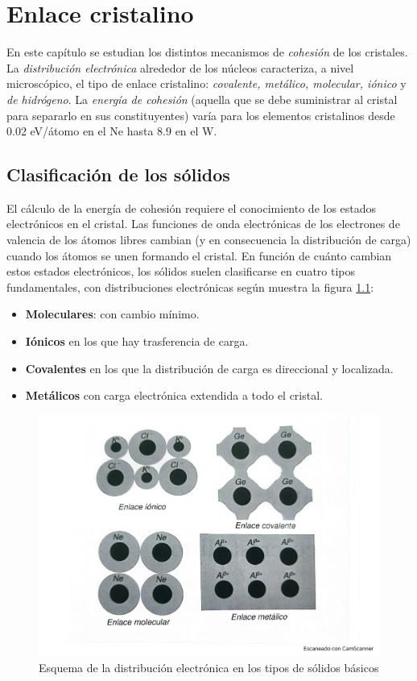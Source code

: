 \chapter{Enlace cristalino}

En este capítulo se estudian los distintos mecanismos de \textit{cohesión} de los cristales. La \textit{distribución electrónica} alrededor de los núcleos caracteriza, a nivel microscópico, el tipo de enlace cristalino: \textit{covalente, metálico, molecular, iónico} y \textit{de hidrógeno}. La \textit{energía de cohesión} (aquella que se debe suministrar al cristal para separarlo en sus constituyentes) varía para los elementos cristalinos desde 0.02 eV/átomo en el Ne hasta 8.9 en el W.

\section{Clasificación de los sólidos}

El cálculo de la energía de cohesión requiere el conocimiento de los estados electrónicos en el cristal. Las funciones de onda electrónicas de los electrones de valencia de los átomos libres cambian (y en consecuencia la distribución de carga) cuando los átomos se unen formando el cristal. En función de cuánto cambian estos estados electrónicos, los sólidos suelen clasificarse en cuatro tipos fundamentales, con distribuciones electrónicas según muestra la figura \ref{Fig:03-01}:

\begin{itemize}
    \item \textbf{Moleculares}: con cambio mínimo.
    \item \textbf{Iónicos} en los que hay trasferencia de carga.
    \item \textbf{Covalentes} en los que la distribución de carga es direccional y localizada.
    \item \textbf{Metálicos} con carga electrónica extendida a todo el cristal.
\end{itemize}

\begin{figure}[h!] \centering
    \includegraphics[scale=0.5]{Cuerpo/Ch_03/Fotos libro 1.pdf}
    \caption{Esquema de la distribución electrónica en los tipos de sólidos básicos}
    \label{Fig:03-01}
\end{figure}    

